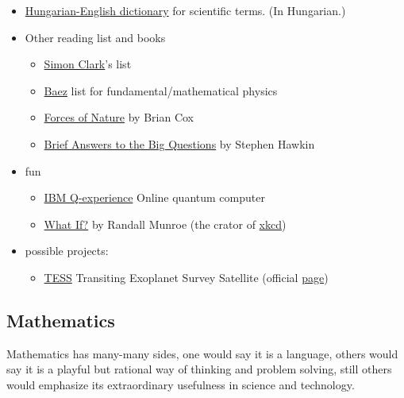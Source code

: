 \documentclass{article}
\begin{document}
\begin{itemize}
\item \href{http://cuhs.co.uk/wp-content/uploads/2011/12/Szakszavak.pdf}{Hungarian-English dictionary} for scientific terms. (In Hungarian.)

\item Other reading list and books

\begin{itemize}
    \item \href{https://www.youtube.com/watch?v=p9s2fBYA4fU}{Simon Clark}'s list
    \item \href{http://math.ucr.edu/home/baez/books.html}{Baez} list for fundamental/mathematical physics
    \item \href{https://www.goodreads.com/book/show/30359599-forces-of-nature}{Forces of Nature} by Brian Cox
    \item \href{https://www.goodreads.com/book/show/40277241-brief-answers-to-the-big-questions}{Brief Answers to the Big Questions} by Stephen Hawkin
\end{itemize}


\item fun
\begin{itemize}
    \item \href{https://quantum-computing.ibm.com/}{IBM Q-experience} Online quantum computer
    \item \href{https://www.goodreads.com/book/show/21413662-what-if-serious-scientific-answers-to-absurd-hypothetical-questions}{What If?} by Randall Munroe (the crator of \href{https://xkcd.com/}{xkcd}) 
\end{itemize}

\item possible projects:
\begin{itemize}
    \item \href{https://archive.stsci.edu/missions-and-data/tess}{TESS} Transiting Exoplanet Survey Satellite (official \href{https://tess.mit.edu/}{page}) 
\end{itemize}

\end{itemize}




\subsection{Mathematics}

Mathematics has many-many sides, one would say it is a language, others would say it is a playful but rational way of thinking and problem solving, still others would emphasize its extraordinary usefulness in science and technology.
\end{document}
